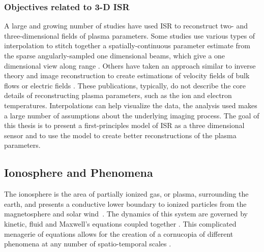 \subsubsection{Objectives related to 3-D ISR}
A large and growing number of studies have used ISR to reconstruct two- and three-dimensional fields of plasma parameters. Some studies use various types of interpolation to stitch together a spatially-continuous parameter estimate from the sparse angularly-sampled one dimensional beams, which give a one dimensional view along range \citep{Semeter2009738,Butler:2013ul,Semeter:2005fo}. Others have taken an approach similar to inverse theory and image reconstruction to create estimations of velocity fields of bulk flows or electric fields \citep{butler:imagingfregiondrifts,RDS:RDS20195}. These publications, typically, do not describe the core details of reconstructing plasma parameters, such as the ion and electron temperatures. Interpolations can help visualize the data, the analysis used makes a large number of assumptions about the underlying imaging process. The goal of this thesis is to present a first-principles model of ISR as a three dimensional sensor and to use the model to create better reconstructions of the plasma parameters.
%
%

\subsection{Ionosphere and Phenomena}
The ionosphere is the area of partially ionized gas, or plasma, surrounding the earth, and presents a conductive lower boundary to ionized particles from the magnetosphere and solar wind~\citep{kellybook}. The dynamics of this system are governed by kinetic, fluid and Maxwell's equations coupled together \citep{schunk2004ionospheres}. This complicated menagerie of equations allows for the creation of a cornucopia of different phenomena at any number of spatio-temporal scales \citep{Semeter:2008hs,Semeter2009738}.


